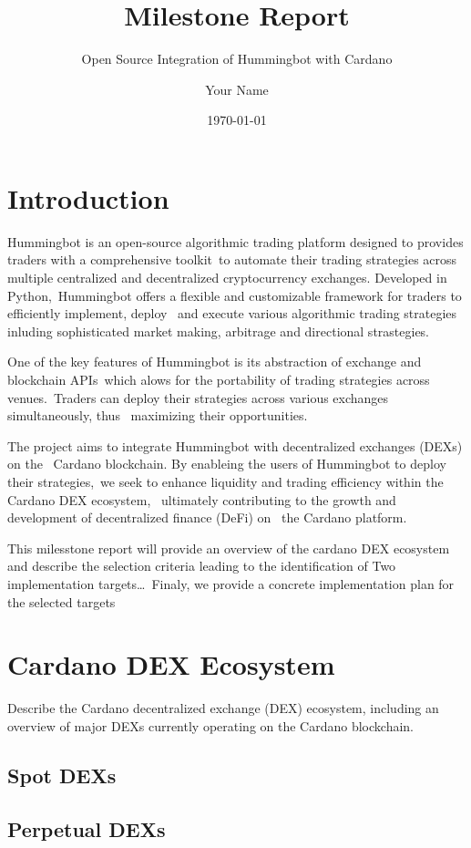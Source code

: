 \documentclass{scrreport}
\title{Milestone Report}
\subtitle{Open Source Integration of Hummingbot with Cardano}
\author{Your Name}
\date{\today}
\begin{document}
\maketitle

\section{Introduction}
Hummingbot is an open-source algorithmic trading platform designed to provides traders with a comprehensive toolkit\
to automate their trading strategies across multiple centralized and decentralized cryptocurrency exchanges. Developed in Python,\
Hummingbot offers a flexible and customizable framework for traders to efficiently implement, deploy \
and execute various algorithmic trading strategies inluding sophisticated market making, arbitrage and directional strastegies.

One of the key features of Hummingbot is its abstraction of exchange and blockchain APIs\
which alows for the portability of trading strategies across venues.\
Traders can deploy their strategies across various exchanges simultaneously, thus \
maximizing their opportunities. 

The project aims to integrate Hummingbot with decentralized exchanges (DEXs) on the \
Cardano blockchain. By enableing the users of Hummingbot to deploy their strategies,\
we seek to enhance liquidity and trading efficiency within the Cardano DEX ecosystem, \
ultimately contributing to the growth and development of decentralized finance (DeFi) on \
the Cardano platform.

This milesstone report will provide an overview of the cardano DEX ecosystem and describe the selection criteria leading to the identification of Two implementation targets\dots\
Finaly, we provide a concrete implementation plan for the selected targets


\section{Cardano DEX Ecosystem}
Describe the Cardano decentralized exchange (DEX) ecosystem, including an overview of major DEXs currently operating on the Cardano blockchain.
\subsection[]{Spot DEXs}
\subsection[]{Perpetual DEXs}
\end{document}
